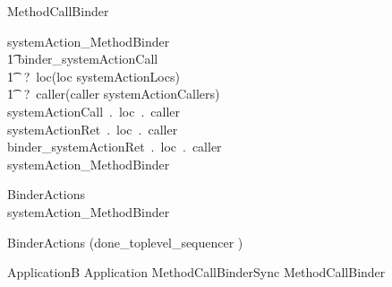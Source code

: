 

\begin{circus}
\circprocess  MethodCallBinder \circdef \circbegin \\
\end{circus}
%
%
\begin{circusaction}
systemAction\_MethodBinder \circdef \\
	\t1 \circblockopen
	binder\_systemActionCall\\ \t1 ~?~loc\prefixcolon(loc \in systemActionLocs)\\ \t1 ~?~caller\prefixcolon(caller \in systemActionCallers)  \then \\
	systemActionCall~.~loc~.~caller  \then \\
	systemActionRet~.~loc~.~caller \then \\
	binder\_systemActionRet~.~loc~.~caller  \then \\
	systemAction\_MethodBinder
	\circblockclose
\end{circusaction}
%
%
\begin{circus}
BinderActions \circdef \\
\circblockopen 
	systemAction\_MethodBinder
	
\circblockclose
\end{circus}
%
\begin{circus}
\circspot BinderActions \circinterrupt (done\_toplevel\_sequencer \then \Skip)
\end{circus}
%
\begin{circus}
\circend
\end{circus}
%
\begin{circus}
\circprocess ApplicationB \circdef Application \lpar MethodCallBinderSync \rpar MethodCallBinder
\end{circus}
